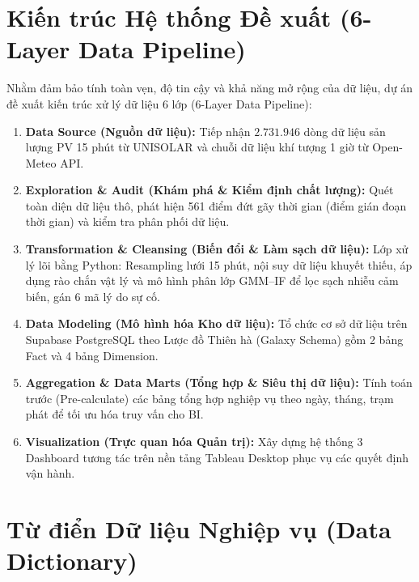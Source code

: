 \section{Kiến trúc Hệ thống Đề xuất (6-Layer Data Pipeline)}
\label{sec:kientruc_dexuat}

Nhằm đảm bảo tính toàn vẹn, độ tin cậy và khả năng mở rộng của dữ liệu, dự án đề xuất kiến trúc xử lý dữ liệu 6 lớp (6-Layer Data Pipeline):

\begin{enumerate}[label=\textbf{Layer \arabic* --}, leftmargin=*]
    \item \textbf{Data Source (Nguồn dữ liệu):} Tiếp nhận $2.731.946$ dòng dữ liệu sản lượng PV 15 phút từ UNISOLAR và chuỗi dữ liệu khí tượng 1 giờ từ Open-Meteo API.
    \item \textbf{Exploration \& Audit (Khám phá \& Kiểm định chất lượng):} Quét toàn diện dữ liệu thô, phát hiện 561 điểm đứt gãy thời gian (điểm gián đoạn thời gian) và kiểm tra phân phối dữ liệu.
    \item \textbf{Transformation \& Cleansing (Biến đổi \& Làm sạch dữ liệu):} Lớp xử lý lõi bằng Python: Resampling lưới 15 phút, nội suy dữ liệu khuyết thiếu, áp dụng rào chắn vật lý và mô hình phân lớp GMM--IF để lọc sạch nhiễu cảm biến, gán 6 mã lý do sự cố.
    \item \textbf{Data Modeling (Mô hình hóa Kho dữ liệu):} Tổ chức cơ sở dữ liệu trên Supabase PostgreSQL theo Lược đồ Thiên hà (Galaxy Schema) gồm 2 bảng Fact và 4 bảng Dimension.
    \item \textbf{Aggregation \& Data Marts (Tổng hợp \& Siêu thị dữ liệu):} Tính toán trước (Pre-calculate) các bảng tổng hợp nghiệp vụ theo ngày, tháng, trạm phát để tối ưu hóa truy vấn cho BI.
    \item \textbf{Visualization (Trực quan hóa Quản trị):} Xây dựng hệ thống 3 Dashboard tương tác trên nền tảng Tableau Desktop phục vụ các quyết định vận hành.
\end{enumerate}

\section{Từ điển Dữ liệu Nghiệp vụ (Data Dictionary)}
\label{sec:tudien_dulieu}

